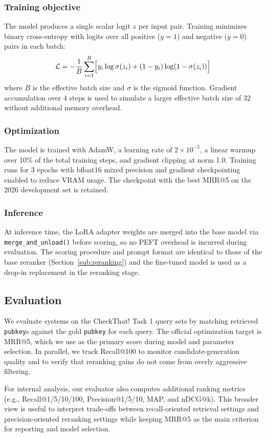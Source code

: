 \subsubsection*{Training objective}
The model produces a single scalar logit $z$ per input pair.
Training minimizes binary cross-entropy with logits over all
positive ($y=1$) and negative ($y=0$) pairs in each batch:
\[
  \mathcal{L} = -\frac{1}{B}\sum_{i=1}^{B}
    \Bigl[ y_i \log \sigma(z_i) + (1 - y_i)\log(1 - \sigma(z_i)) \Bigr]
\]
where $B$ is the effective batch size and $\sigma$ is the sigmoid function. Gradient accumulation over 4 steps is used to simulate a larger effective batch size of 32 without additional memory overhead.

\subsubsection*{Optimization}
The model is trained with AdamW, a learning rate of $2 \times 10^{-5}$, a linear warmup over 10\% of the total training steps, and gradient clipping at norm 1.0. Training runs for 3 epochs with bfloat16 mixed precision and gradient checkpointing enabled to reduce VRAM usage. The checkpoint with the best MRR@5 on the 2026 development set is retained.

\subsubsection*{Inference}
At inference time, the LoRA adapter weights are merged into the base model via \texttt{merge\_and\_unload()} before scoring, so no PEFT overhead is incurred during evaluation. The scoring procedure and prompt format are identical to those of the base reranker (Section~\ref{sub:reranking}) and the fine-tuned model is used as a drop-in replacement in the reranking stage.

\subsection{Evaluation}
We evaluate systems on the CheckThat! Task 1 query sets by matching retrieved \texttt{pubkey}s against the gold \texttt{pubkey} for each query. The official optimization target is MRR@5, which we use as the primary score during model and parameter selection. In parallel, we track Recall@100 to monitor candidate-generation quality and to verify that reranking gains do not come from overly aggressive filtering.

For internal analysis, our evaluator also computes additional ranking metrics (e.g., Recall@1/5/10/100, Precision@1/5/10,
MAP, and nDCG@k). This broader view is useful to interpret trade-offs between recall-oriented retrieval settings and
precision-oriented reranking settings while keeping MRR@5 as the main criterion for reporting and model selection.
